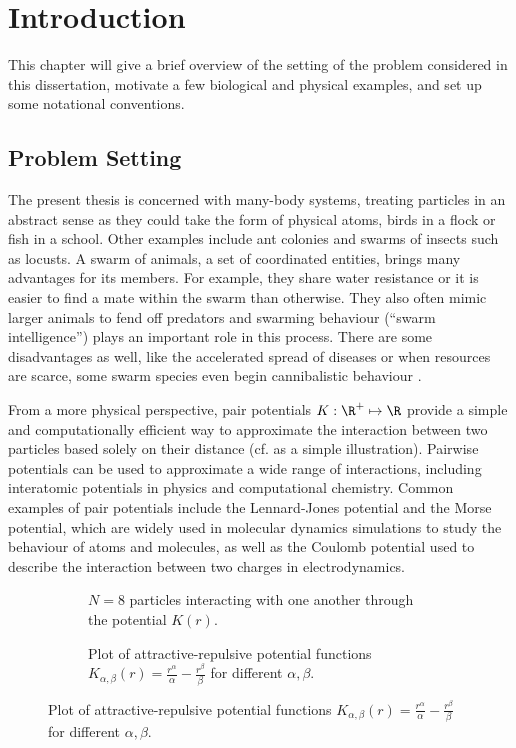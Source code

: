 \chapter{Introduction}
\label{chap:introduction}

This chapter will give a brief overview of the setting of the problem considered in this dissertation, motivate a few biological and physical examples, and set up some notational conventions.

\section{Problem Setting}
The present thesis is concerned with many-body systems, treating particles in an abstract sense as they could take the form of physical atoms, birds in a flock or fish in a school.
Other examples include ant colonies and swarms of insects such as locusts.
A swarm of animals, a set of coordinated entities, brings many advantages for its members.
For example, they share water resistance or it is easier to find a mate within the swarm than otherwise.
They also often mimic larger animals to fend off predators and swarming behaviour (``swarm intelligence'') plays an important role in this process.
There are some disadvantages as well, like the accelerated spread of diseases or when resources are scarce, some swarm species even begin cannibalistic behaviour \parencite{2017-maria-orsogna-swarm-video}.

From a more physical perspective, pair potentials $K: \R^+ \mapsto \R$ provide a simple and computationally efficient way to approximate the interaction between two particles based solely on their distance (cf.  as a simple illustration).
Pairwise potentials can be used to approximate a wide range of interactions, including interatomic potentials in physics and computational chemistry.
Common examples of pair potentials include the Lennard-Jones potential and the Morse potential, which are widely used in molecular dynamics simulations to study the behaviour of atoms and molecules, as well as the Coulomb potential used to describe the interaction between two charges in electrodynamics.

\begin{figure}[H]
  \centering
  \begin{subfigure}[t]{0.47\textwidth}
    \centering
    \caption[]{$N = 8$ particles interacting with one another through the potential $K(r)$.}
    \label{fig:problem-setting}
  \end{subfigure}
  \hfill
  \begin{subfigure}[t]{0.47\textwidth}
    \centering
    \caption[]{Plot of attractive-repulsive potential functions $K_{\alpha, \beta}(r) = \frac{r^\alpha}{\alpha} - \frac{r^\beta}{\beta}$ for different $\alpha, \beta$.}
    \label{fig:potential-function}
  \end{subfigure}
\end{figure}

